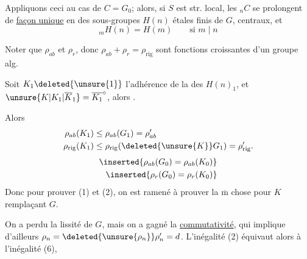 

Appliquons ceci au cas de $C=G_0$; alors, si $S$ est  str. local, les $ {}_nC$ se prolongent de \uline{façon unique} en des sous-groupes $H(n)$  étales finis de $G$,  centraux, et
\[
{}_mH(n)=H(m)\qquad\text{si }m\mid n
\]

Noter que $\rho_{ab}$ et $\rho_r$, donc $\rho_{ab}+\rho_r=\rho_{\mathrm{rig}}$ sont fonctions croissantes d'un groupe  alg.

Soit $K_1\deleted{\unsure{1}}$ l'adhérence de la  des $H(n)_1$,  et $\unsure{K|K_1|\overline{K}_1}=\overline{K_1}^{\circ}$, alors .

Alors
\[
\begin{aligned}
\rho_{ab}(K_1)&\leq\rho_{ab}(G_1)=\rho'_{ab}\\
\rho_{\mathrm{rig}}(K_1)&\leq\rho_{\mathrm{rig}}(\deleted{\unsure{K}}G_1)=\rho'_{\mathrm{rig}}.
\end{aligned}
\]
\[
\begin{aligned}
\inserted{\rho_{ab}(G_0)=\rho_{ab}(K_0)}\\
\inserted{\rho_r(G_0)=\rho_r(K_0)}
\end{aligned}
\]
Donc pour prouver (1) et (2), on est ramené à prouver la $\overline{\mathrm m}$ chose pour $K$ remplaçant $G$.

On a perdu la lissité de $G$, mais on a gagné la \uline{commutativité}, qui implique d'ailleurs $\rho_n=\deleted{\unsure{\rho_n}}\rho'_n=d$. L'inégalité (2) équivaut alors à l'inégalité (6),  
